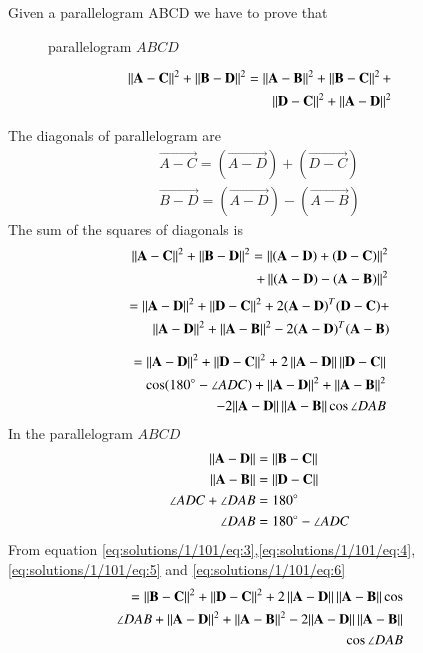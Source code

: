 
Given a parallelogram ABCD we have to prove that
\begin{figure}[!ht]
	\centering
	\resizebox{\columnwidth}{!}{}
	\caption{parallelogram ${ABCD}$}
	\label{eq:solutions/1/101/fig1:Parallelogram}
\end{figure}
	
\begin{align}\label{eq:solutions/1/101/eq:1}
    	\left\lVert\mathbf{A-C}\right\rVert^2 + \left\lVert\mathbf{B-D}\right\rVert^2 = \nonumber  \left\lVert\mathbf{A-B}\right\rVert^2+\left\lVert\mathbf{B-C}\right\rVert^2+\\\left\lVert\mathbf{D-C}\right\rVert^2+\left\lVert\mathbf{A-D}\right\rVert^2
\end{align}

 The diagonals of  parallelogram are
\begin{align}
	\vec{A-C} = (\vec{A-D}) +(\vec{D-C})\\
	\vec{B-D} = (\vec{A-D}) -(\vec{A-B})
\end{align} 
The sum  of the squares of diagonals is
\begin{align}
\left\lVert\mathbf{A-C}\right\rVert^2 +\left\lVert\mathbf{B-D}\right\rVert^2 = \nonumber  
\left\lVert(\mathbf{A-D}) +(\mathbf{D-C})\right\rVert^2\\+ \left\lVert(\mathbf{A-D}) -(\mathbf{A-B})\right\rVert^2
\end{align}
\begin{align}
=\left\lVert\mathbf{A-D}\right\rVert^2 +\left\lVert\mathbf{D-C}\right\rVert^2 + 2{(\mathbf{A-D})}^T{(\mathbf{D-C})} + \nonumber 
\\\left\lVert\mathbf{A-D}\right\rVert^2+\left\lVert\mathbf{A-B}\right\rVert^2-2{(\mathbf{A-D})}^T{(\mathbf{A-B})}\label{eq:solutions/1/101/eq:2}
\end{align}

\begin{align}\label{eq:solutions/1/101/eq:3}
= \left\lVert\mathbf{A-D}\right\rVert^2 +\left\lVert\mathbf{D-C}\right\rVert^2 + 2\left\lVert\mathbf{A-D}\right\rVert\left\lVert\mathbf{D-C}\right\rVert\nonumber 
\\\cos(180\degree-\angle{ADC})  +\left\lVert\mathbf{A-D}\right\rVert^2+\left\lVert\mathbf{A-B}\right\rVert^2\nonumber 
\\-2{\left\lVert\mathbf{A-D}\right\rVert\left\lVert\mathbf{A-B}\right\rVert}\cos\angle{DAB}
\end{align}
In the parallelogram $ABCD$  
\begin{align}
	\left\lVert\mathbf{A-D}\right\rVert&=\left\lVert\mathbf{B-C}\right\rVert\label{eq:solutions/1/101/eq:4}\\
	\left\lVert\mathbf{A-B}\right\rVert &= \left\lVert\mathbf{D-C}\right\rVert\label{eq:solutions/1/101/eq:5}\\
	\angle{ADC} + \angle{DAB} &= 180\degree\\
	\angle{DAB} &= 180\degree -\angle{ADC} \label{eq:solutions/1/101/eq:6}
\end{align}
From equation \eqref{eq:solutions/1/101/eq:3},\eqref{eq:solutions/1/101/eq:4},\eqref{eq:solutions/1/101/eq:5}  and \eqref{eq:solutions/1/101/eq:6}
\begin{align}
=\left\lVert\mathbf{B-C}\right\rVert^2 +\left\lVert\mathbf{D-C}\right\rVert^2+2\left\lVert\mathbf{A-D}\right\rVert\left\lVert\mathbf{A-B}\right\rVert\cos\nonumber\\\angle{DAB}+ \left\lVert\mathbf{A-D}\right\rVert^2+\left\lVert\mathbf{A-B}\right\rVert^2-2{\left\lVert\mathbf{A-D}\right\rVert\left\lVert\mathbf{A-B}\right\rVert}\nonumber\\\cos\angle{DAB}\label{eq:solutions/1/101/eq:7}  
\end{align}


